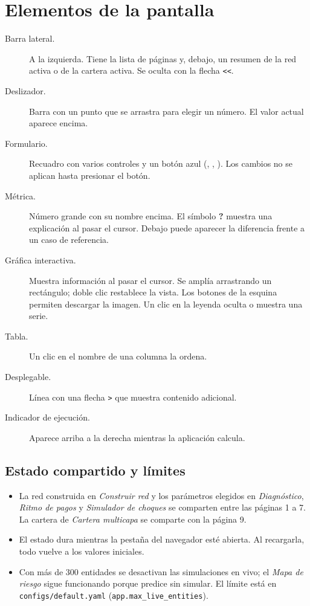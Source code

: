 \section{Elementos de la pantalla}
\label{sec:pantalla}
\begin{description}
\item[Barra lateral.] A la izquierda. Tiene la lista de páginas y, debajo, un resumen de
la red activa o de la cartera activa. Se oculta con la flecha \texttt{<<}.
\item[Deslizador.] Barra con un punto que se arrastra para elegir un número. El valor
actual aparece encima.
\item[Formulario.] Recuadro con varios controles y un botón azul (,
, ). Los cambios no se aplican hasta presionar el
botón.
\item[Métrica.] Número grande con su nombre encima. El símbolo \textbf{?} muestra una
explicación al pasar el cursor. Debajo puede aparecer la diferencia frente a un caso de
referencia.
\item[Gráfica interactiva.] Muestra información al pasar el cursor. Se amplía
arrastrando un rectángulo; doble clic restablece la vista. Los botones de la esquina
permiten descargar la imagen. Un clic en la leyenda oculta o muestra una serie.
\item[Tabla.] Un clic en el nombre de una columna la ordena.
\item[Desplegable.] Línea con una flecha \texttt{>} que muestra contenido adicional.
\item[Indicador de ejecución.] Aparece arriba a la derecha mientras la aplicación calcula.
\end{description}

\subsection{Estado compartido y límites}
\begin{itemize}
\item La red construida en \emph{Construir red} y los parámetros elegidos en
\emph{Diagnóstico}, \emph{Ritmo de pagos} y \emph{Simulador de choques} se comparten entre
las páginas 1 a 7. La cartera de \emph{Cartera multicapa} se comparte con la página 9.
\item El estado dura mientras la pestaña del navegador esté abierta. Al recargarla, todo
vuelve a los valores iniciales.
\item Con más de 300 entidades se desactivan las simulaciones en vivo; el \emph{Mapa de
riesgo} sigue funcionando porque predice sin simular. El límite está en
\texttt{configs/default.yaml} (\texttt{app.max\_live\_entities}).
\end{itemize}

